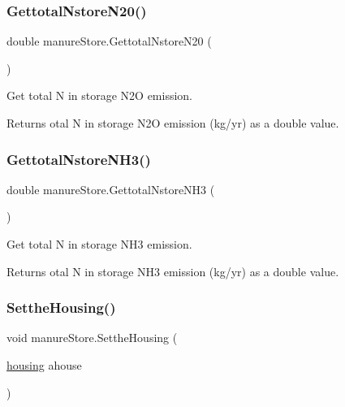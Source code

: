 \subsubsection{\texorpdfstring{GettotalNstoreN20()}{GettotalNstoreN20()}}
{\footnotesize\ttfamily double manure\+Store.\+Gettotal\+Nstore\+N20 (\begin{DoxyParamCaption}{ }\end{DoxyParamCaption})\hspace{0.3cm}{\ttfamily [inline]}}



Get total N in storage N2O emission. 

\begin{DoxyReturn}{Returns}
otal N in storage N2O emission (kg/yr) as a double value. 
\end{DoxyReturn}
\mbox{\label{classmanure_store_a9ed01f678a77c1eb6223a345cd03d692}} 
\subsubsection{\texorpdfstring{GettotalNstoreNH3()}{GettotalNstoreNH3()}}
{\footnotesize\ttfamily double manure\+Store.\+Gettotal\+Nstore\+N\+H3 (\begin{DoxyParamCaption}{ }\end{DoxyParamCaption})\hspace{0.3cm}{\ttfamily [inline]}}



Get total N in storage N\+H3 emission. 

\begin{DoxyReturn}{Returns}
otal N in storage N\+H3 emission (kg/yr) as a double value. 
\end{DoxyReturn}
\mbox{\label{classmanure_store_a12a1c24ccbb83a3bb556202613d2971c}} 
\subsubsection{\texorpdfstring{SettheHousing()}{SettheHousing()}}
{\footnotesize\ttfamily void manure\+Store.\+Setthe\+Housing (\begin{DoxyParamCaption}\item[{\mbox{\hyperlink{classhousing}{housing}}}]{ahouse }\end{DoxyParamCaption})\hspace{0.3cm}{\ttfamily [inline]}}



